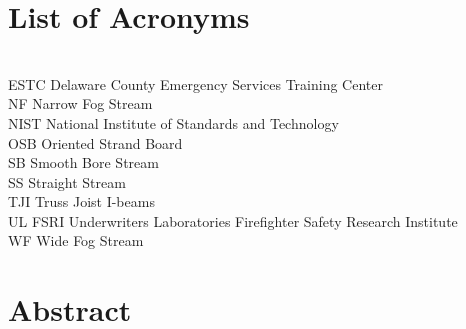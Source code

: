 \documentclass[12pt,oneside]{book}
\begin{document}
\cleardoublepage
{}
{}
\tableofcontents

\cleardoublepage
{}
{}
\listoffigures

\cleardoublepage
{}
{}
\listoftables

\chapter{List of Acronyms}

\begin{tabbing}
\hspace{1.5in} \= \\
ESTC \> Delaware County Emergency Services Training Center \\
NF \> Narrow Fog Stream\\
NIST \> National Institute of Standards and Technology \\
OSB \> Oriented Strand Board \\
SB \> Smooth Bore Stream\\
SS \> Straight Stream \\
TJI \> Truss Joist I-beams \\ 
UL FSRI \> Underwriters Laboratories Firefighter Safety Research Institute \\
WF \> Wide Fog Stream \\
\end{tabbing}

\newpage 

\mainmatter


\chapter*{\centering Abstract}
\end{document}

